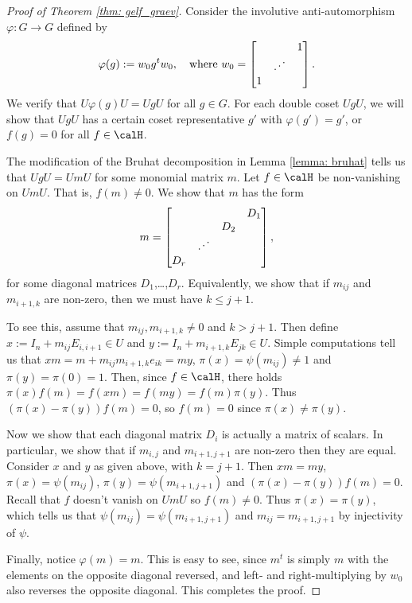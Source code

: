 \begin{proof}[Proof of Theorem \ref{thm: gelf_graev}]
    Consider the involutive anti-automorphism $\varphi\colon G \to G$ defined by
    \[
        \varphi(g) := w_0 g^t w_0,\quad\text{where}\ w_0 =
        \begin{bmatrix}
              &                       & 1 \\
              & \reflectbox{$\ddots$} &   \\
            1 &                       &
        \end{bmatrix}.
    \]
    We verify that $U\varphi(g)U=UgU$ for all $g\in G$.
    For each double coset $UgU$, we will show that $UgU$ has a certain coset representative $g'$ with $\varphi(g')=g'$, or $f(g)=0$ for all $f\in\calH$.

    The modification of the Bruhat decomposition in Lemma \ref{lemma: bruhat} tells us that $UgU=UmU$ for some monomial matrix $m$.
    Let $f\in\calH$ be non-vanishing on $UmU$.
    That is, $f(m)\neq 0$.
    We show that $m$ has the form
    \[
        m = \begin{bmatrix}
                &                       &     & D_1 \\
                &                       & D_2 &     \\
                & \reflectbox{$\ddots$} &     &     \\
            D_r &                       &     &
        \end{bmatrix},
    \]
    for some diagonal matrices $D_1$,\ldots,$D_r$.
    Equivalently, we show that if $m_{ij}$ and $m_{i+1,k}$ are non-zero, then we must have $k\leq j+1$.

    To see this, assume that $m_{ij},m_{i+1,k}\neq 0$ and $k>j+1$.
    Then define $x :=I_n + m_{ij}E_{i,i+1}\in U$ and $y:= I_n +m_{i+1,k}E_{jk}\in U$.
    Simple computations tell us that $xm = m+m_{ij}m_{i+1,k}e_{ik} = my$, $\pi(x)=\psi(m_{ij})\neq 1$ and $\pi(y)=\pi(0)=1$.
    Then, since $f\in\calH$, there holds $\pi(x)f(m)=f(xm)=f(my)=f(m)\pi(y)$.
    Thus $(\pi(x)-\pi(y))f(m)=0$, so $f(m)=0$ since $\pi(x)\neq \pi(y)$.

    Now we show that each diagonal matrix $D_i$ is actually a matrix of scalars.
    In particular, we show that if $m_{i,j}$ and $m_{i+1,j+1}$ are non-zero then they are equal.
    Consider $x$ and $y$ as given above, with $k=j+1$.
    Then $xm=my$, $\pi(x)=\psi(m_{ij})$, $\pi(y)=\psi(m_{i+1,j+1})$ and $(\pi(x)-\pi(y))f(m)=0$.
    Recall that $f$ doesn't vanish on $UmU$ so $f(m)\neq 0$.
    Thus $\pi(x)=\pi(y)$, which tells us that $\psi(m_{ij})=\psi(m_{i+1,j+1})$ and $m_{ij}=m_{i+1,j+1}$ by injectivity of $\psi$.

    Finally, notice $\varphi(m)=m$.
    This is easy to see, since $m^t$ is simply $m$ with the elements on the opposite diagonal reversed, and left- and right-multiplying by $w_0$ also reverses the opposite diagonal.
    This completes the proof.
\end{proof}

